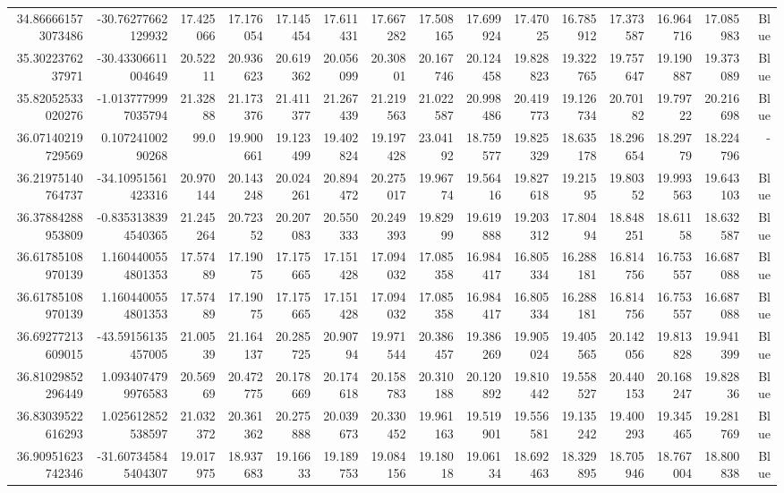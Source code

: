 \begin{center}
\begin{longtable}{rrrrrrrrrrrrrrr}
34.866661573073486 & -30.76277662129932 & 17.425066 & 17.176054 & 17.145454 & 17.611431 & 17.667282 & 17.508165 & 17.699924 & 17.47025 & 16.785912 & 17.373587 & 16.964716 & 17.085983 & Blue \\
35.3022376237971 & -30.43306611004649 & 20.52211 & 20.936623 & 20.619362 & 20.056099 & 20.30801 & 20.167746 & 20.124458 & 19.828823 & 19.322765 & 19.757647 & 19.190887 & 19.373089 & Blue \\
35.82052533020276 & -1.0137779997035794 & 21.32888 & 21.173376 & 21.411377 & 21.267439 & 21.219563 & 21.022587 & 20.998486 & 20.419773 & 19.126734 & 20.70182 & 19.79722 & 20.216698 & Blue \\
36.07140219729569 & 0.10724100290268 & 99.0 & 19.900661 & 19.123499 & 19.402824 & 19.197428 & 23.04192 & 18.759577 & 19.825329 & 18.635178 & 18.296654 & 18.29779 & 18.224796 & - \\
36.21975140764737 & -34.10951561423316 & 20.970144 & 20.143248 & 20.024261 & 20.894472 & 20.275017 & 19.96774 & 19.56416 & 19.827618 & 19.21595 & 19.80352 & 19.993563 & 19.643103 & Blue \\
36.37884288953809 & -0.8353138394540365 & 21.245264 & 20.72352 & 20.207083 & 20.550333 & 20.249393 & 19.82999 & 19.619888 & 19.203312 & 17.80494 & 18.848251 & 18.61158 & 18.632587 & Blue \\
36.61785108970139 & 1.1604400554801353 & 17.57489 & 17.19075 & 17.175665 & 17.151428 & 17.094032 & 17.085358 & 16.984417 & 16.805334 & 16.288181 & 16.814756 & 16.753557 & 16.687088 & Blue \\
36.61785108970139 & 1.1604400554801353 & 17.57489 & 17.19075 & 17.175665 & 17.151428 & 17.094032 & 17.085358 & 16.984417 & 16.805334 & 16.288181 & 16.814756 & 16.753557 & 16.687088 & Blue \\
36.69277213609015 & -43.59156135457005 & 21.00539 & 21.164137 & 20.285725 & 20.90794 & 19.971544 & 20.386457 & 19.386269 & 19.905024 & 19.405565 & 20.142056 & 19.813828 & 19.941399 & Blue \\
36.81029852296449 & 1.0934074799976583 & 20.56969 & 20.472775 & 20.178669 & 20.174618 & 20.158783 & 20.310188 & 20.120892 & 19.810442 & 19.558527 & 20.440153 & 20.168247 & 19.82836 & Blue \\
36.83039522616293 & 1.025612852538597 & 21.032372 & 20.361362 & 20.275888 & 20.039673 & 20.330452 & 19.961163 & 19.519901 & 19.556581 & 19.135242 & 19.400293 & 19.345465 & 19.281769 & Blue \\
36.90951623742346 & -31.607345845404307 & 19.017975 & 18.937683 & 19.16633 & 19.189753 & 19.084156 & 19.18018 & 19.06134 & 18.692463 & 18.329895 & 18.705946 & 18.767004 & 18.800838 & Blue \\

\end{longtable}
\end{center}
